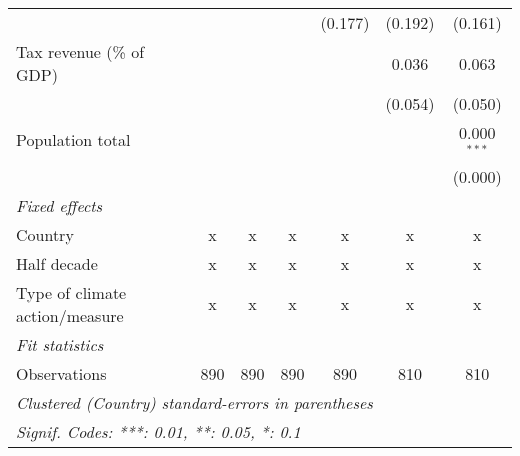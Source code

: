 \begin{tabular}{lcccccc}
                                                &              &              &              & (0.177)        & (0.192)        & (0.161)\\   
   Tax revenue (\% of GDP)                      &              &              &              &                & 0.036          & 0.063\\   
                                                &              &              &              &                & (0.054)        & (0.050)\\   
   Population total                             &              &              &              &                &                & 0.000$^{***}$\\   
                                                &              &              &              &                &                & (0.000)\\   
   \emph{Fixed effects}\\
   Country                                      & x            & x            & x            & x              & x              & x\\  
   Half decade                                  & x            & x            & x            & x              & x              & x\\  
   Type of climate action/measure               & x            & x            & x            & x              & x              & x\\  
   \midrule \emph{Fit statistics}\\
   Observations                                 & 890          & 890          & 890          & 890            & 810            & 810\\  
   \midrule
   \multicolumn{7}{l}{\emph{Clustered (Country) standard-errors in parentheses}}\\
   \multicolumn{7}{l}{\emph{Signif. Codes: ***: 0.01, **: 0.05, *: 0.1}}\\
\end{tabular}
\par\endgroup


